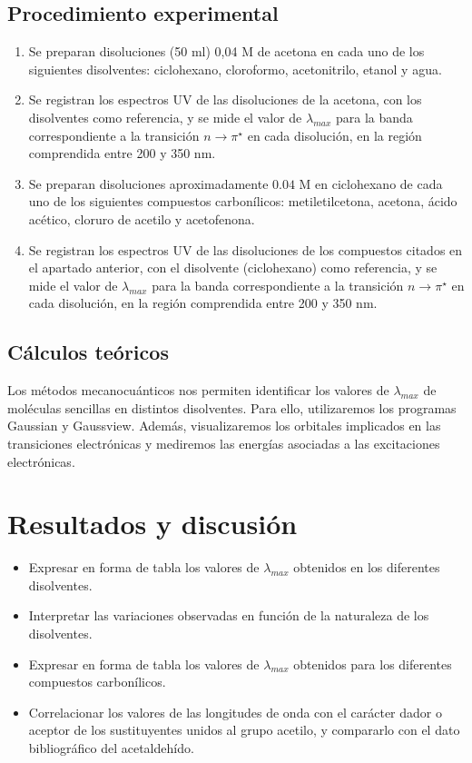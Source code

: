 \documentclass{tufte-handout}
\begin{document}
\subsection{Procedimiento experimental}
\begin{enumerate}
    \item Se preparan disoluciones (50 ml) 0,04 M de acetona en cada uno de los siguientes disolventes: ciclohexano, cloroformo, acetonitrilo, etanol y agua.
    \item Se registran los espectros UV de las disoluciones de la acetona, con los disolventes como referencia, y se mide el valor de $\lambda_{max}$ para la banda correspondiente a la transición $n\rightarrow\pi^\star$ en cada disolución, en la región comprendida entre 200 y 350 nm.
    \item Se preparan disoluciones aproximadamente $0.04$ M en ciclohexano de cada uno de los siguientes compuestos carbonílicos: metiletilcetona, acetona, ácido acético, cloruro de acetilo y acetofenona.
    \item Se registran los espectros UV de las disoluciones de los compuestos citados en el apartado anterior, con el disolvente (ciclohexano) como referencia, y se mide el valor de $\lambda_{max}$ para la banda correspondiente a la transición $n\rightarrow\pi^\star$ en cada disolución, en la región comprendida entre 200 y 350 nm.
\end{enumerate}

\subsection{Cálculos teóricos}
Los métodos mecanocuánticos nos permiten identificar los
valores de $\lambda_{max}$ de moléculas sencillas en distintos
disolventes. Para ello, utilizaremos los programas Gaussian y
Gaussview. Además, visualizaremos los orbitales implicados en
las transiciones electrónicas y mediremos las energías 
asociadas a las excitaciones electrónicas.

\section{Resultados y discusión}
\begin{itemize}
    \item Expresar en forma de tabla los valores de $\lambda_{max}$ obtenidos en los diferentes disolventes.
\item Interpretar las variaciones observadas en función de la naturaleza de los disolventes.
\item Expresar en forma de tabla los valores de $\lambda_{max}$ obtenidos para los diferentes compuestos
carbonílicos.
\item Correlacionar los valores de las longitudes de onda con el carácter dador o aceptor de los
sustituyentes unidos al grupo acetilo, y compararlo con el dato bibliográfico del
acetaldehído.
\end{itemize}
\end{document}
